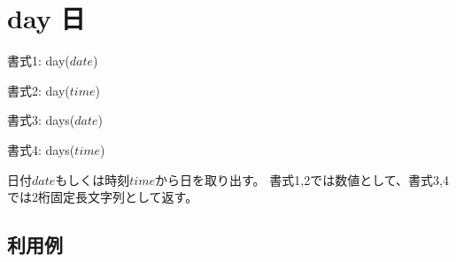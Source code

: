 
%

\section{day 日\label{sect:day}}

書式1: day($date$)

書式2: day($time$)

書式3: days($date$)

書式4: days($time$)


日付$date$もしくは時刻$time$から日を取り出す。
書式1,2では数値として、書式3,4では2桁固定長文字列として返す。

\subsection*{利用例}


%

